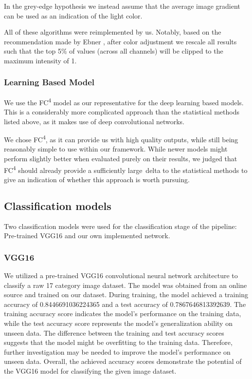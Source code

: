 In the grey-edge hypothesis we instead assume that the average image gradient can be used as an indication of the light color.

All of these algorithms were reimplemented by us. Notably, based on the recommendation made by Ebner \cite{EbnerConstancy},
after color adjustment we rescale all results such that the top 5\% of values (across all channels) will be clipped to
the maximum intensity of 1.

\subsubsection{Learning Based Model}

We use the FC\textsuperscript{4} model\cite{hu2017fc} as our representative for the deep learning based models. This is a considerably more complicated approach
than the statistical methods listed above, as it makes use of deep convolutional networks.

We chose FC\textsuperscript{4}, as it can provide us with high quality outputs, while still being reasonably simple to use within our framework. While newer
models might perform slightly better when evaluated purely on their results, we judged that FC\textsuperscript{4} should already provide a sufficiently large\
delta to the statistical methods to give an indication of whether this approach is worth pursuing.

\subsection{Classification models}

Two classification models were used for the classification stage of the pipeline: Pre-trained VGG16 and our own implemented network. %

\subsubsection{VGG16}
We utilized a pre-trained VGG16 convolutional neural network architecture to classify a raw 17 category image dataset.
The model was obtained from an online source and trained on our dataset. During training, the model achieved a training accuracy of 0.8446691036224365 and a test accuracy of 0.7867646813392639.
The training accuracy score indicates the model's performance on the training data, while the test accuracy score represents the model's generalization ability on unseen data.
The difference between the training and test accuracy scores suggests that the model might be overfitting to the training data. Therefore, further investigation may be needed to improve the model's performance on unseen data.
Overall, the achieved accuracy scores demonstrate the potential of the VGG16 model for classifying the given image dataset.

